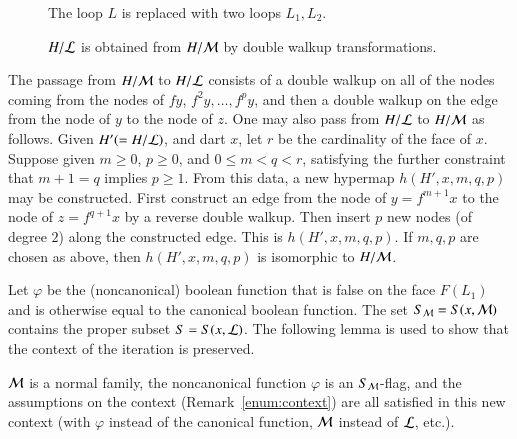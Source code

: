 \begin{figure}[htb]
  \centering
  \caption{The loop $L$ is replaced with two loops $L_1, L_2$.}
  \label{fig:L1L2}
\end{figure}

\begin{figure}[htb]
  \centering
  \caption{$H/{\cal L}$ is obtained from $H/{\cal M}$ by double walkup transformations.}
  \label{fig:L1L2dart}
\end{figure}

The passage from  $H/{\cal M}$ to $H/{\cal L}$ consists of  a double walkup on all of the nodes coming from the nodes of $f y$, $f^2 y, \ldots, f^p y$, and then a double walkup on the edge from the node of $y$ to the node of $z$.  %
One may also pass from $H/{\cal L}$ to $H/{\cal M}$ as follows.
Given $H' (= H/{\cal L})$, and dart $x$, let $r$ be the cardinality of the face of $x$.  Suppose given $m\ge 0$, $p\ge 0$, and $0 \le m < q < r$, satisfying the further constraint that $m+1=q$ implies $p\ge1$.  From this data, a new hypermap $h(H',x,m,q,p)$ may be constructed.  First construct an edge from the node of $y = f^{m+1} x$ to the node of $z = f^{q+1} x$ by a reverse double walkup.  Then insert $p$ new nodes (of degree $2$) along the constructed edge.  This is $h(H',x,m,q,p)$.  If $m,q,p$ are chosen as above, then $h(H',x,m,q,p)$ is isomorphic to $H/{\cal M}$.


Let $\varphi$ be the (noncanonical) boolean function that is false on the face $F(L_1)$ and is otherwise equal to the canonical boolean function. The set $S_{\cal M}=S(x,{\cal M})$ contains the proper subset $S=S(x,{\cal L})$.  The following lemma is used to show that the context of the iteration is preserved.

\begin{lemma}  
${\cal M}$ is a normal family, the noncanonical function $\varphi$ is an $S_{\cal M}$-flag, and the assumptions on the context (Remark~\ref{enum:context}) are all satisfied in this new context (with $\varphi$ instead of the canonical function, ${\cal M}$ instead of ${\cal L}$, etc.).
\end{lemma}


